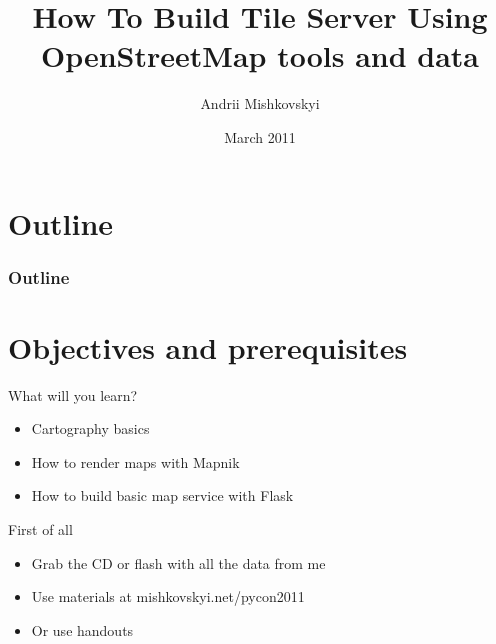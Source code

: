 \documentclass[17pt]{beamer}
\begin{document}
\title{How To Build Tile Server Using OpenStreetMap tools and data}
\author{Andrii Mishkovskyi}
\date{March 2011}

\maketitle



\section*{Outline}

\begin{frame}
  \frametitle{Outline}
  \scriptsize{\tableofcontents}
\end{frame}

\section{Objectives and prerequisites}

\begin{frame}{What will you learn?}
  \begin{itemize}
  \item Cartography basics
  \item How to render maps with Mapnik
  \item How to build basic map service with Flask
  \end{itemize}
\end{frame}

\begin{frame}{First of all}
  \begin{itemize}
  \item Grab the CD or flash with all the data from me
  \item Use materials at mishkovskyi.net/pycon2011
  \item Or use handouts
  \end{itemize}
\end{frame}
\end{document}
